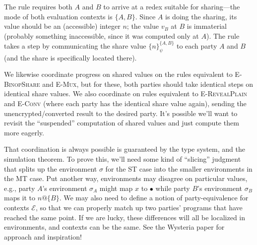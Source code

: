 \documentclass[10pt]{article}
\makeatletter
\newcommand{\rulelab}[1]{{\small \textsc{#1}}}
\newcommand{\kw}[1]{\ensuremath{\mathtt{#1}}}
\newcommand{\ebinop}[2]{\ensuremath{{#1}~\oplus~{#2}}}
\newcommand{\ereveal}[3]{\ensuremath{\kw{reveal}\{{#1}\!:\!{#2}\}~{#3}}}
\newcommand{\eshare}[4]{\ensuremath{\kw{share}\{{#1}\!:\!{#2}\rightarrow{#3}\}~{#4}}}
\newcommand{\vshare}[3]{\ensuremath{\{{#3}\}^{#1}_{#2}}}
\newcommand{\vloc}[2]{\ensuremath{{#1}\kw{@}{#2}}}
\newcommand{\vcrash}{\ensuremath{\bullet}}
\newcommand{\env}{\ensuremath{\sigma}}
\newcommand{\ctxt}{\ensuremath{\mathcal{E}}}
\makeatother
\begin{document}
The rule requires both $A$ and $B$ to arrive at a redex suitable
for sharing---the mode of both evaluation contexts is
$\{A,B\}$. Since $A$ is doing the sharing, its value should be an
(accessible) integer $n$; the value $v_B$ at $B$ is immaterial
(probably something inaccessible, since it was computed only at $A$).
The rule takes a step by communicating the share
value $\vshare{\{A,B\}}{\psi}{n}$ to each party $A$ and $B$ (and the
share is specifically located there).

We likewise coordinate progress on shared values on the rules
equivalent to \rulelab{E-BinopShare} and \rulelab{E-Mux}, but for
these, both parties should take identical steps on identical share
values. We also coordinate on rules equivalent to
\rulelab{E-RevealPlain} and \rulelab{E-Conv}
(where each party has the identical share value again), sending the
unencrypted/converted result to the desired party. It's possible we'll want to
revisit the ``suspended'' computation of shared values and just
compute them more eagerly.

That coordination is always possible is guaranteed by the type system,
and the simulation theorem. To prove this, we'll need some kind of
``slicing'' judgment that splits up the environment $\env$ for the ST
case into the smaller environments in the MT case. Put another way,
environments may disagree on particular values, e.g., party $A$'s
environment $\env_A$ might map $x$ to $\vcrash$ while party $B$'s
environment $\env_B$ maps it to $\vloc{n}{\{B\}}$. We may also need to
define a notion of party-equivalence for contexts $\ctxt$, so that we
can properly match up two parties' programs that have reached the same
point. If we are lucky, these differences will all be localized in
environments, and contexts can be the same. See the Wysteria paper for
approach and inspiration!

\end{document}
